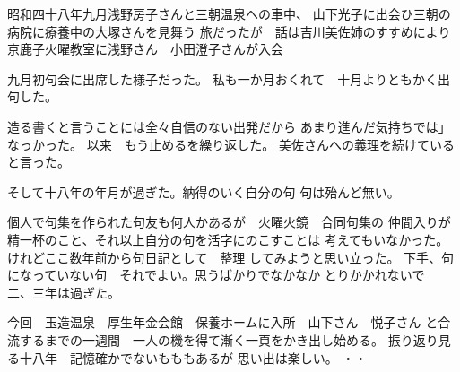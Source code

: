 昭和四十八年九月浅野房子さんと三朝温泉への車中、
山下光子に出会ひ三朝の病院に療養中の大塚さんを見舞う
旅だったが　話は吉川美佐姉のすすめにより
京鹿子火曜教室に浅野さん　小田澄子さんが入会


九月初句会に出席した様子だった。
私も一か月おくれて　十月よりともかく出句した。

造る書くと言うことには全々自信のない出発だから
あまり進んだ気持ちでは」なっかった。
以来　もう止めるを繰り返した。
美佐さんへの義理を続けていると言った。

そして十八年の年月が過ぎた。納得のいく自分の句
句は殆んど無い。

個人で句集を作られた句友も何人かあるが　火曜火鏡　合同句集の
仲間入りが精一杯のこと、それ以上自分の句を活字にのこすことは
考えてもいなかった。けれどここ数年前から句日記として　整理
してみようと思い立った。
下手、句になっていない句　それでよい。思うばかりでなかなか
とりかかれないで　二、三年は過ぎた。

今回　玉造温泉　厚生年金会館　保養ホームに入所　山下さん　悦子さん
と合流するまでの一週間　一人の機を得て漸く一頁をかき出し始める。
振り返り見る十八年　記憶確かでないもももあるが
思い出は楽しい。
\hfill {   ・・}

